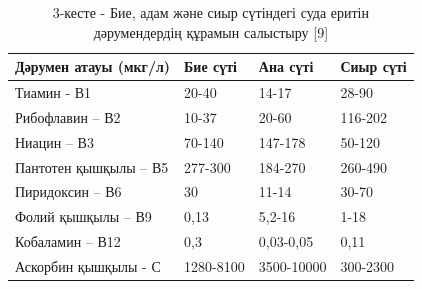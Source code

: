 \begin{table}[H]
\caption*{3-кесте - Бие, адам және сиыр сүтіндегі суда еритін дәрумендердің құрамын салыстыру {[}9{]}}
\centering
\begin{tabular}{|l|l|l|l|}
\hline
Дәрумен атауы (мкг/л) & Бие сүті & Ана сүті & Сиыр сүті \\ \hline
Тиамин - В1 & 20-40 & 14-17 & 28-90 \\ \hline
Рибофлавин – В2 & 10-37 & 20-60 & 116-202 \\ \hline
Ниацин – В3 & 70-140 & 147-178 & 50-120 \\ \hline
Пантотен қышқылы – В5 & 277-300 & 184-270 & 260-490 \\ \hline
Пиридоксин – В6 & 30 & 11-14 & 30-70 \\ \hline
Фолий қышқылы – В9 & 0,13 & 5,2-16 & 1-18 \\ \hline
Кобаламин – В12 & 0,3 & 0,03-0,05 & 0,11 \\ \hline
Аскорбин қышқылы - С & 1280-8100 & 3500-10000 & 300-2300 \\ \hline
\end{tabular}
\end{table}

